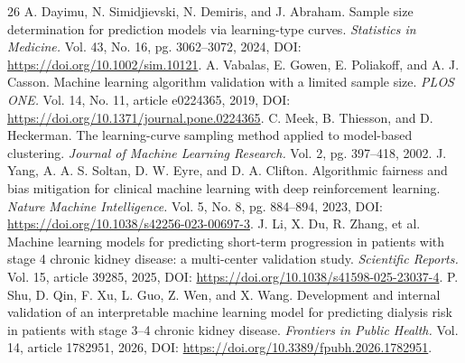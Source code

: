 \documentclass[12pt]{article}
\begin{document}
\begin{thebibliography}{26}
 A. Dayimu, N. Simidjievski, N. Demiris, and J. Abraham. Sample size determination for prediction models via learning-type curves. \emph{Statistics in Medicine.} Vol. 43, No. 16, pg. 3062--3072, 2024, DOI: \url{https://doi.org/10.1002/sim.10121}.
 A. Vabalas, E. Gowen, E. Poliakoff, and A. J. Casson. Machine learning algorithm validation with a limited sample size. \emph{PLOS ONE.} Vol. 14, No. 11, article e0224365, 2019, DOI: \url{https://doi.org/10.1371/journal.pone.0224365}.
 C. Meek, B. Thiesson, and D. Heckerman. The learning-curve sampling method applied to model-based clustering. \emph{Journal of Machine Learning Research.} Vol. 2, pg. 397--418, 2002.
 J. Yang, A. A. S. Soltan, D. W. Eyre, and D. A. Clifton. Algorithmic fairness and bias mitigation for clinical machine learning with deep reinforcement learning. \emph{Nature Machine Intelligence.} Vol. 5, No. 8, pg. 884--894, 2023, DOI: \url{https://doi.org/10.1038/s42256-023-00697-3}.
 J. Li, X. Du, R. Zhang, et al. Machine learning models for predicting short-term progression in patients with stage 4 chronic kidney disease: a multi-center validation study. \emph{Scientific Reports.} Vol. 15, article 39285, 2025, DOI: \url{https://doi.org/10.1038/s41598-025-23037-4}.
 P. Shu, D. Qin, F. Xu, L. Guo, Z. Wen, and X. Wang. Development and internal validation of an interpretable machine learning model for predicting dialysis risk in patients with stage 3--4 chronic kidney disease. \emph{Frontiers in Public Health.} Vol. 14, article 1782951, 2026, DOI: \url{https://doi.org/10.3389/fpubh.2026.1782951}.
\end{thebibliography}
\end{document}
